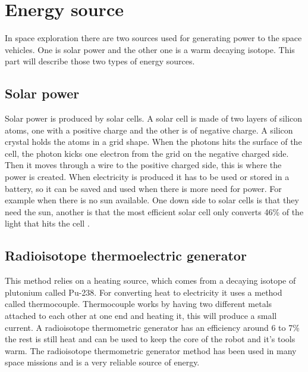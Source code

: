 \section{Energy source}

In space exploration there are two sources used for generating power to the space vehicles. One is solar power and the other one is a warm decaying isotope. This part will describe those two types of energy sources.

\subsection{Solar power}

Solar power is produced by solar cells. A solar cell is made of two layers of silicon atoms, one with a positive charge and the other is of negative charge. A silicon crystal holds the atoms in a grid shape. When the photons hits the surface of the cell, the photon kicks one electron from the grid on the negative charged side. Then it moves through a wire to the positive charged side, this is where the power is created. When electricity is produced it has to be used or stored in a battery, so it can be saved and used when there is more need for power. For example when there is no sun available. One down side to solar cells is that they need the sun, another is that the most efficient solar cell only converts 46\% of the light that hits the cell \cite{SolarPanels}.

\subsection{Radioisotope thermoelectric generator}

This method relies on a heating source, which comes from a decaying isotope of plutonium called Pu-238. For converting heat to electricity it uses a method called thermocouple. Thermocouple works by having two different metals attached to each other at one end and heating it, this will produce a small current.
A radioisotope thermometric generator has an efficiency around 6 to 7\% the rest is still heat and can be used to keep the core of the robot and it's tools warm. The radioisotope thermometric generator method has been used in many space missions and is a very reliable source of energy\cite{RTG}.

